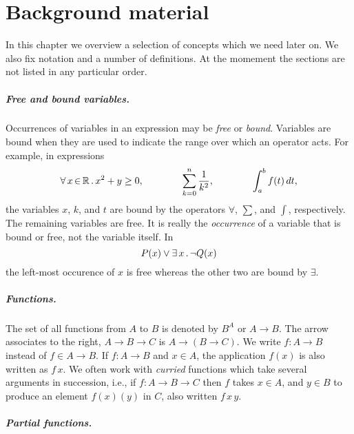 \chapter{Background material}
\label{chap:background-material}

In this chapter we overview a selection of concepts which we need
later on. We also fix notation and a number of definitions. At the
momement the sections are not listed in any particular order.

\paragraph{Free and bound variables.}

Occurrences of variables in an expression may be \emph{free} or
\emph{bound}. Variables are bound when they are used to indicate the
range over which an operator acts. For example, in expressions
%
\begin{equation*}
  \forall\, x \,{\in}\, \mathbb{R}\,.\,x^2 + y \geq 0,
  \qquad\qquad
  \sum_{k = 0}^n \frac{1}{k^2},
  \qquad\qquad
  \int_a^b f(t) \, dt,
\end{equation*}
%
the variables $x$, $k$, and $t$ are bound by the operators $\forall$,
$\sum$, and $\int$, respectively. The remaining variables are free. It
is really the \emph{occurrence} of a variable that is bound or free,
not the variable itself. In
%
\begin{equation*}
  P(x) \lor \exists\, x\,.\,\lnot Q(x)
\end{equation*}
%
the left-most occurence of $x$ is free whereas the other two are bound
by $\exists$.

\paragraph{Functions.}

The set of all functions from $A$ to $B$ is denoted by $B^A$ or $A \to
B$. The arrow associates to the right, $A \to B \to C$ is $A \to (B
\to C)$. We write $f : A \to B$ instead of $f \in A \to B$. If $f : A
\to B$ and $x \in A$, the application $f(x)$ is also written as $f\,
x$. We often work with \emph{curried} functions which take several
arguments in succession, i.e., if $f : A \to B \to C$ then $f$ takes
$x \in A$, and $y \in B$ to produce an element $f(x)(y)$ in $C$, also
written $f\, x\, y$.


\paragraph{Partial functions.}

